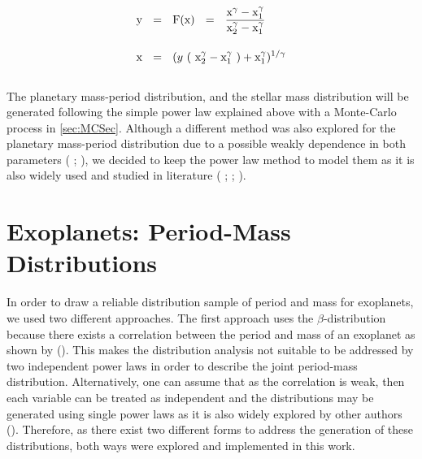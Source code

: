 \begingroup
\Large
\begin{equation}
  \begin{align*}
    \textnormal{y} & ~~=~~  \textnormal{F}(\textnormal{x}) ~~=~~ \frac{\textnormal{x}^{\gamma} - \textnormal{x}_1^{\gamma}}{\textnormal{x}_2^{\gamma} - \textnormal{x}_1^{\gamma}} \\[10pt]
    \textnormal{x} & ~~=~~  (y~ (~\textnormal{x}_2^{\gamma} - \textnormal{x}_1^{\gamma}~) + \textnormal{x}_1^{\gamma})^{1/\gamma}
    \label{eq:RandomVar}
  \end{align*}
\end{equation}
\endgroup\\

The planetary mass-period distribution, and the stellar mass distribution will be generated following the simple power law explained above with a Monte-Carlo process in \autoref{sec:MCSec}. Although a different method was also explored for the planetary mass-period distribution due to a possible weakly dependence in both parameters ( \citeyear{1538-3881-134-5-2061};  \citeyear{2002ApJ...568L.113Z}), we decided to keep the power law method to model them as it is also widely used and studied in literature ( \citeyear{2010EAS....41..107N};  \citeyear{2008PASP..120..531C};  \citeyear{2006ApJ...646..505B}).  

\section{Exoplanets: Period-Mass Distributions} \label{ref:PM_ExoPlanet}

In order to draw a reliable distribution sample of period and mass for exoplanets, we used two different approaches. The first approach uses the $\beta$-distribution because there exists a correlation between the period and mass of an exoplanet as shown by  (\citeyear{2002ApJ...568L.113Z}). This makes the distribution analysis not suitable to be addressed by two independent power laws in order to describe the joint period-mass distribution. Alternatively, one can assume that as the correlation is weak, then each variable can be treated as independent and the distributions may be generated using single power laws as it is also widely explored by other authors  (\citeyear{2010EAS....41..107N}). Therefore, as there exist two different forms to address the generation of these distributions, both ways were explored and implemented in this work.\\

